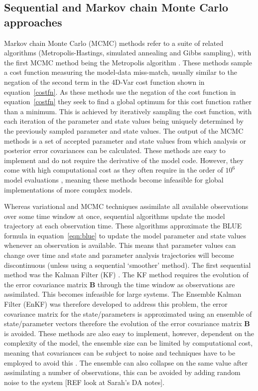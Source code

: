 \documentclass[12pt]{article}
\begin{document}
\subsection{Sequential and Markov chain Monte Carlo approaches}

Markov chain Monte Carlo (MCMC) methods refer to a suite of related algorithms (Metropolis-Hastings, simulated annealing and Gibbs sampling), with the first MCMC method being the Metropolis algorithm \citep{metropolis1953equation}. These methods sample a cost function measuring the model-data miss-match, usually similar to the negation of the second term in the 4D-Var cost function shown in equation~\eqref{costfn}. As these methods use the negation of the cost function in equation~\eqref{costfn} they seek to find a global optimum for this cost function rather than a minimum. This is achieved by iteratively sampling the cost function, with each iteration of the parameter and state values being uniquely determined by the previously sampled parameter and state values. The output of the MCMC methods is a set of accepted parameter and state values from which analysis or posterior error covariances can be calculated. These methods are easy to implement and do not require the derivative of the model code. However, they come with high computational cost as they often require in the order of \(10^{6}\) model evaluations \citep{zobitz2011primer}, meaning these methods become infeasible for global implementations of more complex models. 

Whereas variational and MCMC techniques assimilate all available observations over some time window at once, sequential algorithms update the model trajectory at each observation time. These algorithms approximate the BLUE formula in equation~\eqref{eqn:blue} to update the model parameter and state values whenever an observation is available. This means that parameter values can change over time and state and parameter analysis trajectories will become discontinuous (unless using a sequential `smoother' method). The first sequential method was the Kalman Filter (KF) \citep{kalman1960}. The KF method requires the evolution of the error covariance matrix \textbf{B} through the time window as observations are assimilated. This becomes infeasible for large systems. The Ensemble Kalman Filter (EnKF) \citep{Evensen2003} was therefore developed to address this problem, the error covariance matrix for the state/parameters is approximated using an ensemble of state/parameter vectors therefore the evolution of the error covariance matrix \textbf{B} is avoided. These methods are also easy to implement, however, dependent on the complexity of the model, the ensemble size can be limited by computational cost, meaning that covariances can be subject to noise and techniques have to be employed to avoid this \citep{Hamill2001}. The ensemble can also collapse on the same value after assimilating a number of observations, this can be avoided by adding random noise to the system [{\color{red}REF look at Sarah's DA notes}]. 
\end{document}

